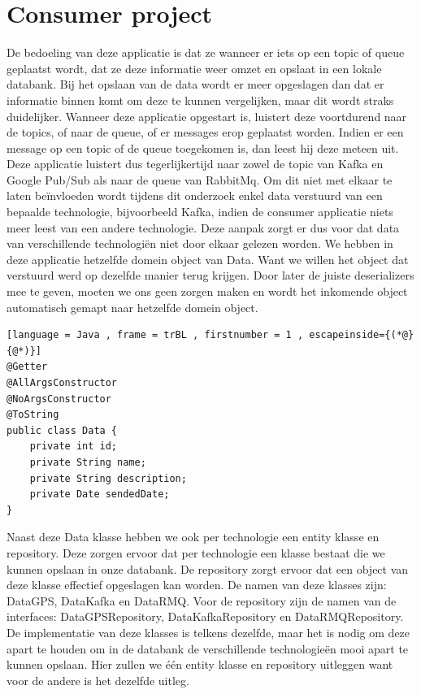 \section{Consumer project}
De bedoeling van deze applicatie is dat ze wanneer er iets op een topic of queue geplaatst wordt, dat ze deze informatie weer omzet en opslaat in een lokale databank. Bij het opslaan van de data wordt er meer opgeslagen dan dat er informatie binnen komt om deze te kunnen vergelijken, maar dit wordt straks duidelijker. Wanneer deze applicatie opgestart is, luistert deze voortdurend naar de topics, of naar de queue, of er messages erop geplaatst worden. Indien er een message op een topic of de queue toegekomen is, dan leest hij deze meteen uit. Deze applicatie luistert dus tegerlijkertijd naar zowel de topic van Kafka en Google Pub/Sub als naar de queue van RabbitMq. Om dit niet met elkaar te laten beïnvloeden wordt tijdens dit onderzoek enkel data verstuurd van een bepaalde technologie, bijvoorbeeld Kafka, indien de consumer applicatie niets meer leest van een andere technologie. Deze aanpak zorgt er dus voor dat data van verschillende technologiën niet door elkaar gelezen worden. We hebben in deze applicatie hetzelfde domein object van Data. Want we willen het object dat verstuurd werd op dezelfde manier terug krijgen. Door later de juiste deserializers mee te geven, moeten we ons geen zorgen maken en wordt het inkomende object automatisch gemapt naar hetzelfde domein object.
\begin{lstlisting}[language = Java , frame = trBL , firstnumber = 1 , escapeinside={(*@}{@*)}]
@Getter
@AllArgsConstructor
@NoArgsConstructor
@ToString
public class Data {
    private int id;
    private String name;
    private String description;
    private Date sendedDate;
}
\end{lstlisting}

Naast deze Data klasse hebben we ook per technologie een entity klasse en repository. Deze zorgen ervoor dat per technologie een klasse bestaat die we kunnen opslaan in onze databank. De repository zorgt ervoor dat een object van deze klasse effectief opgeslagen kan worden. De namen van deze klasses zijn: DataGPS, DataKafka en DataRMQ. Voor de repository zijn de namen van de interfaces: DataGPSRepository, DataKafkaRepository en DataRMQRepository. De implementatie van deze klasses is telkens dezelfde, maar het is nodig om deze apart te houden om in de databank de verschillende technologieën mooi apart te kunnen opslaan. Hier zullen we één entity klasse en repository uitleggen want voor de andere is het dezelfde uitleg.

